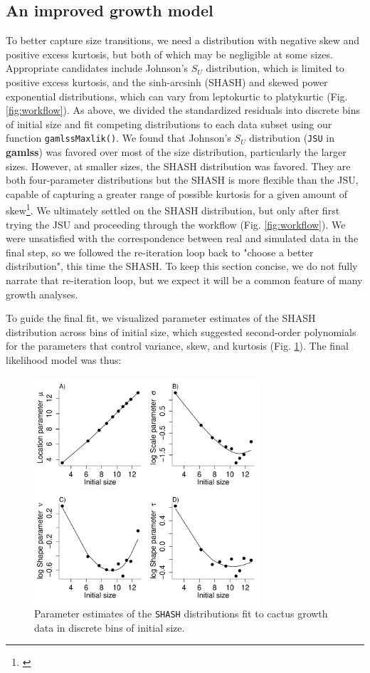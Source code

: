 \documentclass[11pt]{article}
\newcommand{\tom}[2]{{\color{red}{#1}}\footnote{\textit{\color{red}{#2}}}}
\begin{document}
{\subsection{An improved growth model}
To better capture size transitions, we need a distribution with negative skew and positive excess kurtosis, but both of which may be negligible at some sizes. 
Appropriate candidates include Johnson's $S_{U}$ distribution, which is limited to positive excess kurtosis, and the sinh-arcsinh (SHASH) and skewed power exponential distributions, which can vary from leptokurtic to platykurtic (Fig. \ref{fig:workflow}). 
As above, we divided the standardized residuals into discrete bins of initial size and fit competing distributions to each data subset using our function \texttt{gamlssMaxlik()}.
We found that Johnson's $S_{U}$ distribution (\texttt{JSU} in \textbf{gamlss}) was favored over most of the size distribution, particularly the larger sizes. 
However, at smaller sizes, the SHASH distribution was favored. 
They are both four-parameter distributions but the SHASH is more flexible than the JSU, capable of capturing a greater range of possible kurtosis for a given amount of skew\tom{}{This comes from Steve's NPSkewKurtosisRanges.pdf}. 
We ultimately settled on the SHASH distribution, but only after first trying the JSU and proceeding through the workflow (Fig. \ref{fig:workflow}). 
We were unsatisfied with the correspondence between real and simulated data in the final step, so we followed the re-iteration loop back to "choose a better distribution", this time the SHASH. 
To keep this section concise, we do not fully narrate that re-iteration loop, but we expect it will be a common feature of many growth analyses. 

To guide the final fit, we visualized parameter estimates of the SHASH distribution across bins of initial size, which suggested second-order polynomials for the parameters that control variance, skew, and kurtosis (Fig. \ref{fig:cactus_binned_SHASH}). 
The final likelihood model was thus:
\begin{figure}
\centering
\includegraphics[width=0.75\textwidth]{figures/cactus_binned_SHASH}
\caption{Parameter estimates of the \texttt{SHASH} distributions fit to cactus growth data in discrete bins of initial size.}
\label{fig:cactus_binned_SHASH}
\end{figure} 

}
\end{document}
